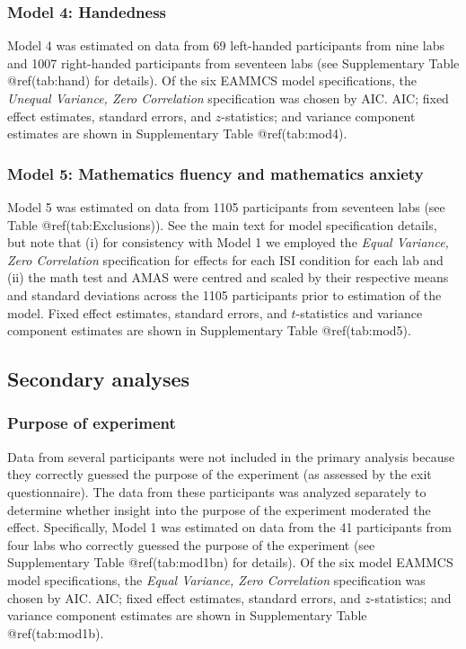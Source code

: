 \begin{appendix}
\subsubsection{Model 4: Handedness}\label{model-4-handedness}

Model 4 was estimated on data from 69 left-handed participants from nine
labs and 1007 right-handed participants from seventeen labs (see
Supplementary Table @ref(tab:hand) for details). Of the six EAMMCS model
specifications, the \emph{Unequal Variance, Zero Correlation}
specification was chosen by AIC. AIC; fixed effect estimates, standard
errors, and \(z\)-statistics; and variance component estimates are shown
in Supplementary Table @ref(tab:mod4).

\subsubsection{Model 5: Mathematics fluency and mathematics
anxiety}\label{model-5-mathematics-fluency-and-mathematics-anxiety}

Model 5 was estimated on data from 1105 participants from seventeen labs
(see Table @ref(tab:Exclusions)). See the main text for model
specification details, but note that (i) for consistency with Model 1 we
employed the \emph{Equal Variance, Zero Correlation} specification for
effects for each ISI condition for each lab and (ii) the math test and
AMAS were centred and scaled by their respective means and standard
deviations across the 1105 participants prior to estimation of the
model. Fixed effect estimates, standard errors, and \(t\)-statistics and
variance component estimates are shown in Supplementary Table
@ref(tab:mod5).

\subsection{Secondary analyses}\label{secondary-analyses}

\subsubsection{Purpose of experiment}\label{purpose-of-experiment}

Data from several participants were not included in the primary analysis
because they correctly guessed the purpose of the experiment (as
assessed by the exit questionnaire). The data from these participants
was analyzed separately to determine whether insight into the purpose of
the experiment moderated the effect. Specifically, Model 1 was estimated
on data from the 41 participants from four labs who correctly guessed
the purpose of the experiment (see Supplementary Table @ref(tab:mod1bn)
for details). Of the six model EAMMCS model specifications, the
\emph{Equal Variance, Zero Correlation} specification was chosen by AIC.
AIC; fixed effect estimates, standard errors, and \(z\)-statistics; and
variance component estimates are shown in Supplementary Table
@ref(tab:mod1b).


\end{appendix}
